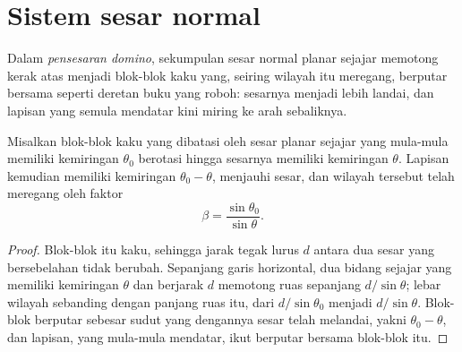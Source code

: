 \begin{omfigure}
\par{}\label{fig:b3:extension-strike-slip:models}
\end{omfigure}

\section{Sistem sesar normal}\label{sec:b3:extension-strike-slip:faults}

\begin{definition}\label{def:b3:extension-strike-slip:domino}
Dalam \emph{pensesaran domino}, sekumpulan sesar normal planar sejajar
memotong kerak atas menjadi blok-blok kaku yang, seiring wilayah itu meregang,
berputar bersama seperti deretan buku yang roboh: sesarnya menjadi
lebih landai, dan lapisan yang semula mendatar kini miring ke arah sebaliknya.
\end{definition}

\begin{theorem}\label{thm:b3:extension-strike-slip:domino}
Misalkan blok-blok kaku yang dibatasi oleh sesar planar sejajar yang mula-mula memiliki kemiringan
$\theta_0$ berotasi hingga sesarnya memiliki kemiringan $\theta$. Lapisan kemudian memiliki kemiringan $\theta_0
- \theta$, menjauhi sesar, dan wilayah tersebut telah meregang oleh
faktor
\[
  \beta = \frac{\sin\theta_0}{\sin\theta} .
\]
\end{theorem}

\begin{proof}
Blok-blok itu kaku, sehingga jarak tegak lurus $d$ antara dua
sesar yang bersebelahan tidak berubah. Sepanjang garis horizontal, dua bidang sejajar
yang memiliki kemiringan $\theta$ dan berjarak $d$ memotong ruas sepanjang $d/\sin
\theta$; lebar wilayah sebanding dengan panjang ruas itu, dari
$d/\sin\theta_0$ menjadi $d/\sin\theta$. Blok-blok berputar sebesar sudut
yang dengannya sesar telah melandai, yakni $\theta_0 - \theta$, dan lapisan, yang mula-mula mendatar,
ikut berputar bersama blok-blok itu.
\end{proof}

